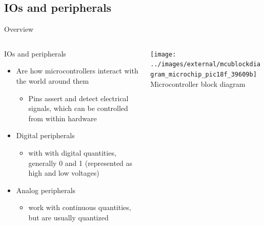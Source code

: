 \documentclass{beamer}
\begin{document}
\subsection{IOs and peripherals}
\begin{frame}{Overview}
  \begin{columns}[T]
    \begin{column}{.6\textwidth}
      IOs and peripherals
      \begin{itemize}
        \item Are how microcontrollers interact with the world around them
        \begin{itemize}
          \item Pins assert and detect electrical signals, which can be controlled from within hardware
        \end{itemize}
        \item Digital peripherals
        \begin{itemize}
          \item with with digital quantities, generally 0 and 1 (represented as high and low voltages)
        \end{itemize}
        \item Analog peripherals
        \begin{itemize}
          \item work with continuous quantities, but are usually quantized
        \end{itemize}
      \end{itemize}
    \end{column}

    \begin{column}{0.4\textwidth} \centering
      \texttt{[image: ../images/external/mcublockdiagram\_microchip\_pic18f\_39609b]} \\
      Microcontroller block diagram
    \end{column}
  \end{columns}
\end{frame}
\end{document}
